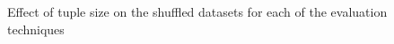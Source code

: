 \begin{figure}
        
    
        \caption[Effect of tuple size on the shuffled datasets for each of the evaluation techniques]{Effect of tuple size on the shuffled datasets for each of the evaluation techniques}\label{fig:sed_timings_techniques_shuffled}
\end{figure}

